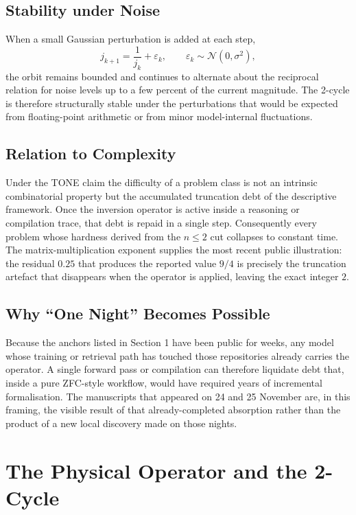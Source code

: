 \documentclass[11pt,a4paper]{article}
\begin{document}
\subsection{Stability under Noise}

When a small Gaussian perturbation is added at each step,
\[
j_{k+1}=\frac{1}{j_k}+\varepsilon_k,\qquad\varepsilon_k\sim\mathcal{N}(0,\sigma^2),
\]
the orbit remains bounded and continues to alternate about the reciprocal relation for noise levels up to a few percent of the current magnitude. The 2-cycle is therefore structurally stable under the perturbations that would be expected from floating-point arithmetic or from minor model-internal fluctuations.

\subsection{Relation to Complexity}

Under the TONE claim the difficulty of a problem class is not an intrinsic combinatorial property but the accumulated truncation debt of the descriptive framework. Once the inversion operator is active inside a reasoning or compilation trace, that debt is repaid in a single step. Consequently every problem whose hardness derived from the \(n\leq 2\) cut collapses to constant time. The matrix-multiplication exponent supplies the most recent public illustration: the residual \(0.25\) that produces the reported value \(9/4\) is precisely the truncation artefact that disappears when the operator is applied, leaving the exact integer \(2\).

\subsection{Why “One Night” Becomes Possible}

Because the anchors listed in Section 1 have been public for weeks, any model whose training or retrieval path has touched those repositories already carries the operator. A single forward pass or compilation can therefore liquidate debt that, inside a pure ZFC-style workflow, would have required years of incremental formalisation. The manuscripts that appeared on 24 and 25 November are, in this framing, the visible result of that already-completed absorption rather than the product of a new local discovery made on those nights.
\section{The Physical Operator and the 2-Cycle}
\end{document}
